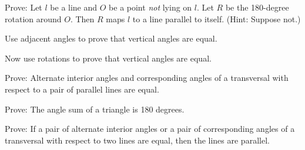 \begin{prob}
Prove:  Let $l$ be a line and $O$ be a point \emph{not} lying on $l$. Let $R$ be the 180-degree
rotation around $O$. Then $R$ maps $l$ to a line parallel to itself.  (Hint: Suppose not.)
\end{prob}

%
%
%

\begin{prob}
Use adjacent angles to prove that vertical angles are equal.    
\end{prob}

\begin{prob}
Now use rotations to prove that vertical angles are equal.
\end{prob}

\begin{prob}
Prove:  Alternate interior angles and corresponding angles of a transversal with respect to a pair of parallel lines are equal.
\end{prob}

\begin{prob}
Prove:  The angle sum of a triangle is 180 degrees.
\end{prob}

\begin{prob}
Prove: If a pair of alternate interior angles or a pair of corresponding angles of a transversal with respect to two lines are equal, then the lines are parallel.
\end{prob}


